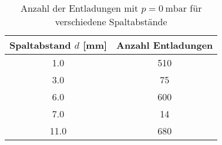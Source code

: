 
\begin{table}[H]
\centering
\caption{Anzahl der Entladungen mit \(p = \SI{0}{\milli\bar}\) für verschiedene Spaltabstände}
\label{tab:updated-discharges}
\begin{tabular}{S[table-format=2.1] S[table-format=3.0]}
\toprule
\textbf{Spaltabstand \(d\) [\si{\milli\meter}]} & \textbf{Anzahl Entladungen} \\
  & 510 \\
3.0  & 75  \\
6.0  & 600 \\
7.0  & 14  \\
11.0 & 680 \\
\bottomrule
\end{tabular}
\end{table}

